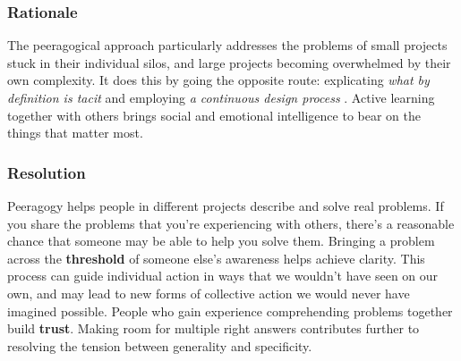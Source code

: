 \subsubsection*{Rationale}
The peeragogical approach particularly addresses the problems of small projects stuck in their individual silos, and large projects becoming overwhelmed by their own complexity.  It does this by going the opposite route: explicating \emph{what by definition is tacit} and employing \emph{a continuous design process} \cite[pp. 9--10]{schummer2014beyond}.   Active learning together with others brings social and emotional intelligence to bear on the things that matter most.

\subsubsection*{Resolution}

Peeragogy helps people in different projects describe and solve real problems. 
If you share the problems that you're experiencing with others, there's a reasonable chance that someone may be able to help you solve them.  Bringing a problem across the \textbf{threshold} of someone else's awareness helps achieve clarity.  
This process can guide individual action in ways that we wouldn't have seen on our own, and may lead to new forms of collective action we would never have imagined possible.  People who gain experience comprehending problems together build \textbf{trust}.
%
Making room for multiple right answers contributes further to resolving the tension between generality and specificity.


